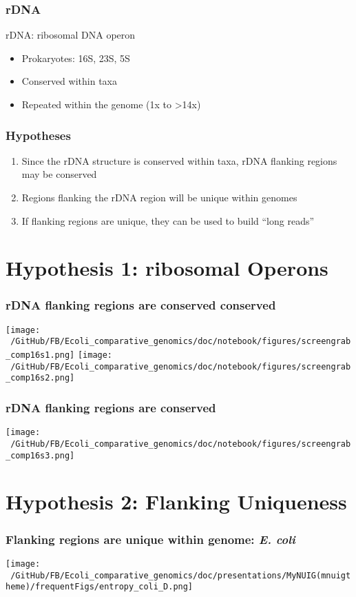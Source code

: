 \documentclass[10pt, compress]{beamer}
\begin{document}
\begin{frame}[fragile]
  \frametitle{rDNA}
  rDNA: ribosomal DNA operon
  \begin{itemize}
    \item Prokaryotes: 16S, 23S, 5S
    \item Conserved within taxa
    \item Repeated within the genome (1x to >14x)
    \end{itemize}
\end{frame}

\begin{frame}[fragile]
\frametitle{Hypotheses}
  \begin{enumerate}
  \item Since the rDNA structure is conserved within taxa, rDNA flanking regions may be conserved
  \item Regions flanking the rDNA region will be unique within genomes
  \item If flanking regions are unique, they can be used to build ``long reads''
\end{enumerate}
\end{frame}
\section{Hypothesis 1: ribosomal Operons}

\begin{frame}[fragile]
  \frametitle{rDNA flanking regions are conserved conserved}
  \centering
  \texttt{[image: ~/GitHub/FB/Ecoli\_comparative\_genomics/doc/notebook/figures/screengrab\_comp16s1.png]}
  \hfill
  \texttt{[image: ~/GitHub/FB/Ecoli\_comparative\_genomics/doc/notebook/figures/screengrab\_comp16s2.png]}
\end{frame}
\begin{frame}[fragile]
  \frametitle{rDNA flanking regions are conserved}
  \hspace*{1cm}
  \texttt{[image: ~/GitHub/FB/Ecoli\_comparative\_genomics/doc/notebook/figures/screengrab\_comp16s3.png]}
\end{frame}

\section{Hypothesis 2: Flanking Uniqueness}

\begin{frame}[fragile]
  \frametitle{Flanking regions are unique within genome: \textit{E. coli}}
  \hspace*{-1cm}
  \texttt{[image: ~/GitHub/FB/Ecoli\_comparative\_genomics/doc/presentations/MyNUIG(mnuigtheme)/frequentFigs/entropy\_coli\_D.png]}
\end{frame}
\end{document}
